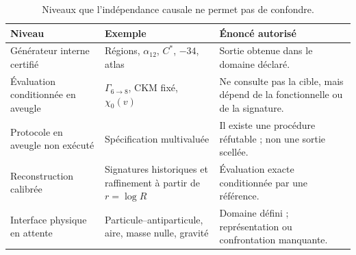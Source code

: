 \begin{table}[htbp]
\centering
\caption{Niveaux que l'indépendance causale ne permet pas de confondre.}
\label{tab:cinco-niveles-independencia}
\small
\begin{tabularx}{\textwidth}{@{}L{0.25\textwidth}YL{0.27\textwidth}@{}}
\toprule
Niveau & Exemple & Énoncé autorisé\\
\midrule
Générateur interne certifié&
Régions, \(\alpha_{12}\), \(C^\ast\), \(-34\), atlas&
Sortie obtenue dans le domaine déclaré.\\
Évaluation conditionnée en aveugle&
\(\Gamma_{6\to8}\), CKM fixé, \(\chi_0(v)\)&
Ne consulte pas la cible, mais dépend de la fonctionnelle ou de la signature.\\
Protocole en aveugle non exécuté&
Spécification multivaluée&
Il existe une procédure réfutable ; non une sortie scellée.\\
Reconstruction calibrée&
Signatures historiques et raffinement à partir de \(r=\log R\)&
Évaluation exacte conditionnée par une référence.\\
Interface physique en attente&
Particule--antiparticule, aire, masse nulle, gravité&
Domaine défini ; représentation ou confrontation manquante.\\
\bottomrule
\end{tabularx}
\end{table}
